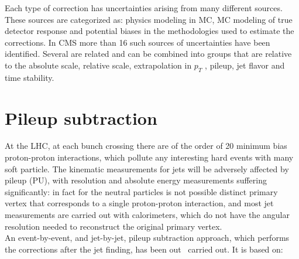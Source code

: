 Each type of correction has uncertainties arising from many different sources.
These sources are categorized as: physics modeling in MC, MC modeling of true detector response and potential biases in the methodologies used to estimate the corrections. In CMS more than 16 such sources of uncertainties have been identified. Several are
related and can be combined into groups that are relative to the absolute scale, relative
scale, extrapolation in $p_T$ , pileup, jet flavor and time stability.

\section{Pileup subtraction}
At the LHC,  at each bunch crossing there are of the order of 20 minimum bias proton-proton interactions, which pollute any interesting hard events with many soft particle. The kinematic measurements for jets will be adversely affected by pileup (PU), with resolution and absolute energy measurements
suffering significantly: in fact for the  neutral particles is not possible distinct primary vertex that corresponds to a single
proton-proton interaction,  and most jet measurements are carried out with calorimeters, which do not have the angular
resolution needed to reconstruct the original primary vertex.\\
An event-by-event, and jet-by-jet, pileup subtraction approach, which performs the corrections after the jet finding,  has been out~\cite{Cacciari:2007fd}
carried out.  It is based on:

